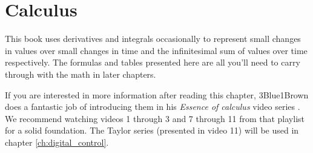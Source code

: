 
\chapter{Calculus}

This book uses derivatives and integrals occasionally to represent small changes
in values over small changes in time and the infinitesimal sum of values over
time respectively. The formulas and tables presented here are all you'll need to
carry through with the math in later chapters.

If you are interested in more information after reading this chapter,
3Blue1Brown does a fantastic job of introducing them in his \textit{Essence of
calculus} video series \cite{bib:essence_of_calculus}. We recommend watching
videos 1 through 3 and 7 through 11 from that playlist for a solid foundation.
The Taylor series (presented in video 11) will be used in chapter
\ref{ch:digital_control}.

\renewcommand*{\chapterpath}{\partpath/calculus}




